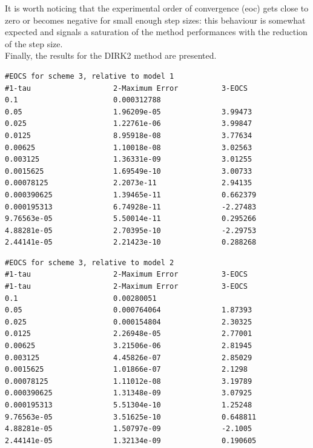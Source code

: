 \documentclass[11pt]{article}
\theoremstyle{theorem}
\theoremstyle{definition}
\begin{document}
It is worth noticing that the experimental order of convergence (eoc) gets close to zero or becomes negative for small enough step sizes: this behaviour is somewhat expected and signals a saturation of the method performances with the reduction of the step size. \\

Finally, the results for the DIRK2 method are presented.\\

\begin{lstlisting}
#EOCS for scheme 3, relative to model 1
#1-tau                   2-Maximum Error          3-EOCS                   
0.1                      0.000312788              	
0.05                     1.96209e-05              3.99473
0.025                    1.22761e-06              3.99847
0.0125                   8.95918e-08              3.77634
0.00625                  1.10018e-08              3.02563
0.003125                 1.36331e-09              3.01255
0.0015625                1.69549e-10              3.00733
0.00078125               2.2073e-11               2.94135
0.000390625              1.39465e-11              0.662379
0.000195313              6.74928e-11              -2.27483
9.76563e-05              5.50014e-11              0.295266
4.88281e-05              2.70395e-10              -2.29753
2.44141e-05              2.21423e-10              0.288268
\end{lstlisting}

\begin{lstlisting}
#EOCS for scheme 3, relative to model 2
#1-tau                   2-Maximum Error          3-EOCS                   
#1-tau                   2-Maximum Error          3-EOCS                   
0.1                      0.00280051               	
0.05                     0.000764064              1.87393
0.025                    0.000154804              2.30325
0.0125                   2.26948e-05              2.77001
0.00625                  3.21506e-06              2.81945
0.003125                 4.45826e-07              2.85029
0.0015625                1.01866e-07              2.1298
0.00078125               1.11012e-08              3.19789
0.000390625              1.31348e-09              3.07925
0.000195313              5.51304e-10              1.25248
9.76563e-05              3.51625e-10              0.648811
4.88281e-05              1.50797e-09              -2.1005
2.44141e-05              1.32134e-09              0.190605
\end{lstlisting}
\end{document}
